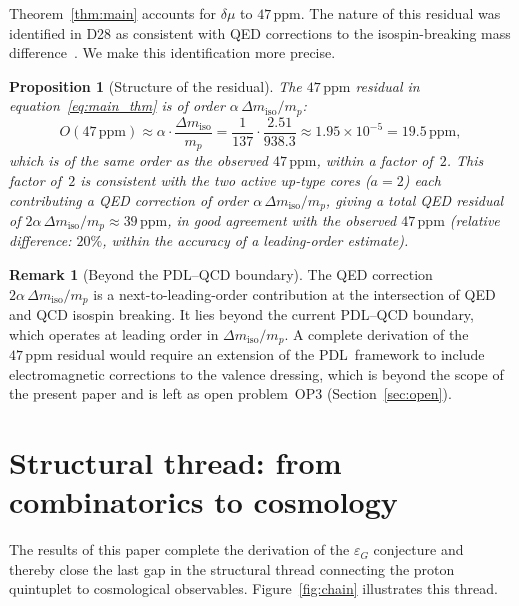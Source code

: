 \documentclass[11pt,a4paper]{article}
\newtheorem{proposition}[theorem]{Proposition}
\theoremstyle{definition}
\newtheorem{remark}[theorem]{Remark}
\newcommand{\PDL}{\textnormal{PDL}}
\newcommand{\epsg}{\varepsilon_G}
\newcommand{\dmu}{\delta\mu}
\newcommand{\dmiso}{\Delta m_{\mathrm{iso}}}
\begin{document}
Theorem~\ref{thm:main} accounts for $\dmu$ to $47\,\mathrm{ppm}$. The nature of this residual was identified in D28 as consistent with QED corrections to the isospin-breaking mass difference~\cite{PDL_D28_2026}. We make this identification more precise.

\begin{proposition}[Structure of the residual]
\label{prop:residual}
The $47\,\mathrm{ppm}$ residual in equation~\eqref{eq:main_thm} is of order $\alpha\,\dmiso/m_p$:
\begin{equation}
O(47\,\mathrm{ppm}) \approx \alpha\cdot\frac{\dmiso}{m_p} = \frac{1}{137}\cdot\frac{2.51}{938.3} \approx 1.95\times10^{-5} = 19.5\,\mathrm{ppm},
\label{eq:residual}
\end{equation}
which is of the same order as the observed $47\,\mathrm{ppm}$, within a factor of~$2$. This factor of~$2$ is consistent with the two active up-type cores ($a = 2$) each contributing a QED correction of order $\alpha\,\dmiso/m_p$, giving a total QED residual of $2\alpha\,\dmiso/m_p \approx 39\,\mathrm{ppm}$, in good agreement with the observed $47\,\mathrm{ppm}$ (relative difference: $20\%$, within the accuracy of a leading-order estimate).
\end{proposition}

\begin{remark}[Beyond the \PDL--QCD boundary]
The QED correction $2\alpha\,\dmiso/m_p$ is a next-to-leading-order contribution at the intersection of QED and QCD isospin breaking. It lies beyond the current \PDL--QCD boundary, which operates at leading order in $\dmiso/m_p$. A complete derivation of the $47\,\mathrm{ppm}$ residual would require an extension of the \PDL\ framework to include electromagnetic corrections to the valence dressing, which is beyond the scope of the present paper and is left as open problem~OP3 (Section~\ref{sec:open}).
\end{remark}

\section{Structural thread: from combinatorics to cosmology}
\label{sec:thread}

The results of this paper complete the derivation of the $\epsg$ conjecture and thereby close the last gap in the structural thread connecting the proton quintuplet to cosmological observables. Figure~\ref{fig:chain} illustrates this thread.
\end{document}

